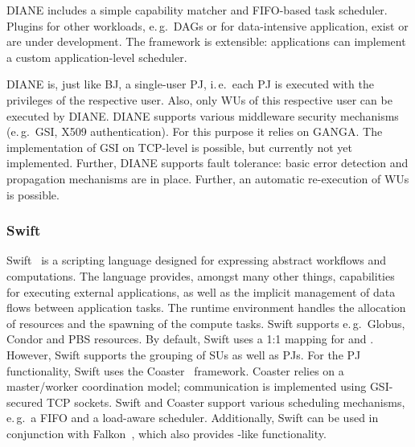 \documentclass{sig-alternate}
\begin{document}
DIANE includes a simple capability matcher and FIFO-based task scheduler.
Plugins for other workloads, e.\,g.\ DAGs or for data-intensive
application, exist or are under development. The framework is extensible:
applications can implement a custom application-level scheduler.


DIANE is, just like BJ, a single-user PJ, i.\,e.\ each PJ is executed with the
privileges of the respective user. Also, only WUs of this respective user can be
executed by DIANE. DIANE supports various middleware security mechanisms
(e.\,g.\ GSI, X509 authentication). For this purpose it relies on GANGA. The
implementation of GSI on TCP-level is possible, but currently not yet
implemented. Further, DIANE supports fault tolerance: basic error detection and
propagation mechanisms are in place. Further, an automatic re-execution of WUs
is possible.

\subsubsection{Swift}
Swift~\cite{Wilde2011} is a scripting language designed for expressing
abstract workflows and computations. The language provides, amongst many other
things, capabilities for executing external applications, as well as the
implicit management of data flows between application tasks. 
The runtime environment handles the allocation of resources and the spawning of 
the compute tasks. 
Swift supports e.\,g.\ Globus, Condor and PBS resources. 
By default, Swift uses a 1:1 mapping for \cus and \sus. However,
Swift supports the grouping of SUs as well as PJs. For the PJ functionality, Swift uses the
Coaster~\cite{coasters} framework. Coaster relies on a master/worker
coordination model; communication is implemented using GSI-secured TCP sockets.
Swift and Coaster support various scheduling mechanisms, e.\,g.\ a FIFO and a
load-aware scheduler. Additionally, Swift can be used in conjunction with 
Falkon~\cite{1362680}, which also provides \pilot-like functionality.
\end{document}
